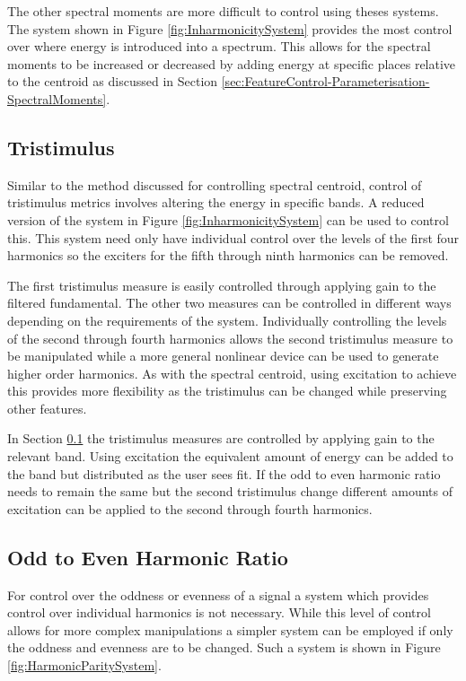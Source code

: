 		The other spectral moments are more difficult to control using theses systems. The system shown in Figure
		\ref{fig:InharmonicitySystem} provides the most control over where energy is introduced into a spectrum.
		This allows for the spectral moments to be increased or decreased by adding energy at specific places
		relative to the centroid as discussed in Section \ref{sec:FeatureControl-Parameterisation-SpectralMoments}.

	\subsection{Tristimulus}
	\label{sec:FeatureControl-Control-Tristimulus}
		Similar to the method discussed for controlling spectral centroid, control of tristimulus metrics involves
		altering the energy in specific bands. A reduced version of the system in Figure
		\ref{fig:InharmonicitySystem} can be used to control this. This system need only have individual control
		over the levels of the first four harmonics so the exciters for the fifth through ninth harmonics can be
		removed.

		The first tristimulus measure is easily controlled through applying gain to the filtered fundamental. The
		other two measures can be controlled in different ways depending on the requirements of the system.
		Individually controlling the levels of the second through fourth harmonics allows the second tristimulus
		measure to be manipulated while a more general nonlinear device can be used to generate higher order
		harmonics. As with the spectral centroid, using excitation to achieve this provides more flexibility as the
		tristimulus can be changed while preserving other features. 

		In Section \ref{sec:FeatureControl-Control-Tristimulus} the tristimulus measures are controlled by applying
		gain to the relevant band. Using excitation the equivalent amount of energy can be added to the band but
		distributed as the user sees fit. If the odd to even harmonic ratio needs to remain the same but the second
		tristimulus change different amounts of excitation can be applied to the second through fourth harmonics.

	\subsection{Odd to Even Harmonic Ratio}
	\label{sec:FeatureControl-Control-HarmonicParityRatio}
		For control over the oddness or evenness of a signal a system which provides control over individual
		harmonics is not necessary. While this level of control allows for more complex manipulations a simpler
		system can be employed if only the oddness and evenness are to be changed. Such a system is shown in Figure
		\ref{fig:HarmonicParitySystem}.

